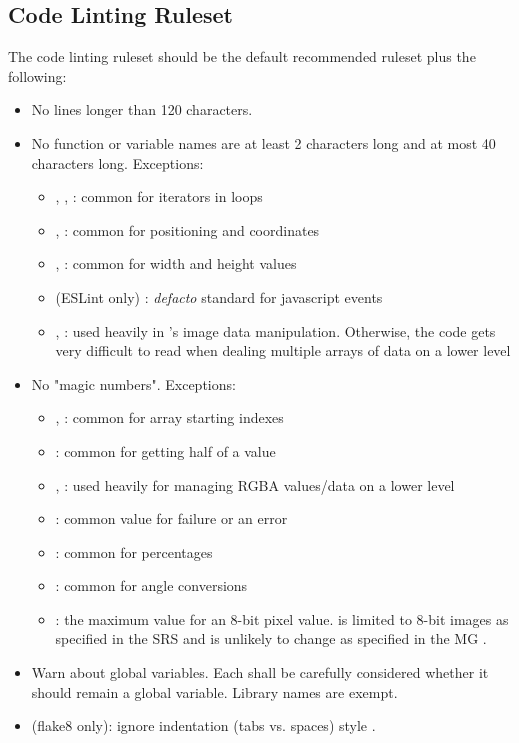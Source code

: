 \documentclass[12pt, titlepage]{article}
\begin{document}
\subsection{Code Linting Ruleset} \label{codelint_ruleset}
The code linting ruleset should be the default recommended ruleset plus the following:
\begin{itemize}
  \item No lines longer than 120 characters.
  \item No function or variable names are at least 2 characters long and at most 40 characters long.
    Exceptions:
    \begin{itemize}
      \item {}, , : common for iterators in loops
      \item {}, : common for positioning and coordinates
      \item {}, : common for width and height values
      \item (ESLint only) : \textit{defacto} standard for javascript events
      \item {}, : used heavily in \progname{}'s image data manipulation.
        Otherwise, the code gets very difficult to read when dealing multiple arrays of data 
        on a lower level
    \end{itemize}
  \item No "magic numbers". Exceptions:
    \begin{itemize}
      \item {}, : common for array starting indexes
      \item {}: common for getting half of a value
      \item {}, : used heavily for managing RGBA values/data on a lower level
      \item {}: common value for failure or an error
      \item {}: common for percentages
      \item {}: common for angle conversions
      \item {}: the maximum value for an 8-bit pixel value.
        \progname{} is limited to 8-bit images as specified in the SRS \cite{SRS}
        and is unlikely to change as specified in the MG \cite{MG}.
    \end{itemize}
  \item Warn about global variables. Each shall be carefully considered whether it should remain
    a global variable. Library names are exempt.
  \item (flake8 only): ignore indentation (tabs vs. spaces) style .
\end{itemize}
\end{document}
